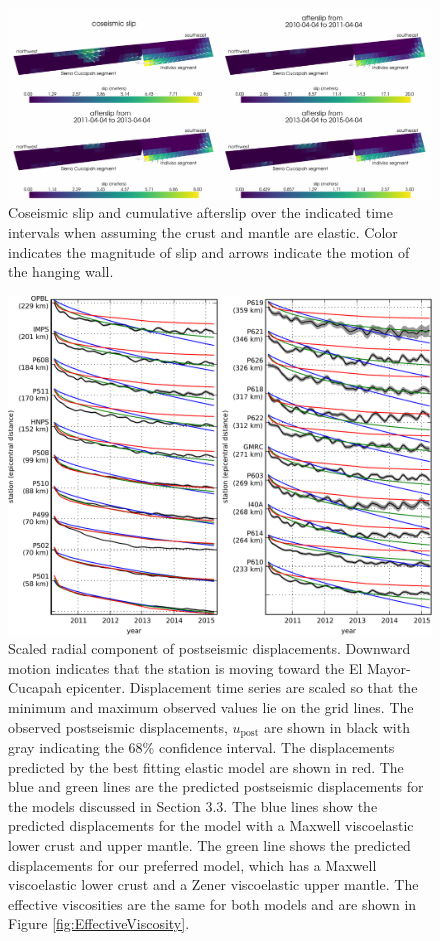 \documentclass[draft,linenumbers]{AGUJournal}
\begin{document}
\begin{figure}
\includegraphics[scale=0.9]{Figures/2016jb013114-p06}
\caption{Coseismic slip and cumulative afterslip over the indicated time intervals when assuming the crust and mantle are elastic.  Color indicates the magnitude of slip and arrows indicate the motion of the hanging wall.}
\label{fig:ElasticSlip}
\end{figure}

\begin{figure}
\includegraphics[scale=0.9]{Figures/2016jb013114-p07}
\caption{Scaled radial component of postseismic displacements. Downward motion indicates that the station is moving toward the El Mayor-Cucapah epicenter.  Displacement time series are scaled so that the minimum and maximum observed values lie on the grid lines.  The observed postseismic displacements, $u_\mathrm{post}$ are shown in black with gray indicating the 68\% confidence interval.  The displacements predicted by the best fitting elastic model are shown in red.  The blue and green lines are the predicted postseismic displacements for the models discussed in Section 3.3. The blue lines show the predicted displacements for the model with a Maxwell viscoelastic lower crust and upper mantle.  The green line shows the predicted displacements for our preferred model, which has a Maxwell viscoelastic lower crust and a Zener viscoelastic upper mantle.  The effective viscosities are the same for both models and are shown in Figure \ref{fig:EffectiveViscosity}.}
\label{fig:RecordSectionMain}
\end{figure}
\end{document}
